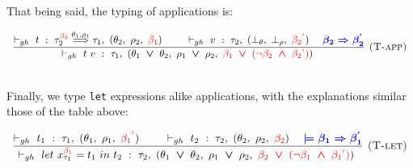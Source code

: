 \documentclass[a4paper,11pt,oneside]{article}
\theoremstyle{plain}
\newcommand{\rouge}[1]{\textcolor{red}{#1}}
\newcommand{\bwedge}{\boldsymbol{~\wedge~}}
\newcommand{\bvee}{\boldsymbol{~\vee~}}
\newcommand{\ghosttyping}[6]{\vdash_{gh}~#1~:~#2,~(#3,~#4,~\rouge{#5})~\textcolor{blue}{\boldsymbol{#6}}}
\newcommand{\bth}{\bot_\theta}
\newcommand{\brh}{\bot_\rho}
\newcommand{\gba}[1]{\beta_{#1}}
\newcommand{\gbb}{\bot_\beta}
\newcommand{\gbt}{\top_\beta}
\newcommand{\gbra}[1]{\textcolor{red}{\gba{#1}}}
\newcommand{\gbbr}{\textcolor{red}{\gbb}}
\newcommand{\gbtr}{\textcolor{red}{\gbt}}
\newcommand{\gbran}[1]{\textcolor{red}{\neg\gba{#1}}}
\begin{document}
That being said, the typing of applications is: 
\begin{footnotesize}	
\begin{displaymath}
\begin{array}{l}
\dfrac
	{
		\ghosttyping
			{t}
			{{\tau_{2}^{\gbra{2}} \stackrel{\theta_1, \rho_1}{\Longrightarrow} \tau_1}}
			{\theta_2}
			{\rho_2}
			{\gbra{1}}
			{} \qquad
		\ghosttyping
		{v}
		{\tau_2}
		{\bth}
		{\brh}
		{\gbra{2}^{\rouge{'}}}
		{\quad \gba{2} \Rightarrow \gba{2}^{'}}}
	{
		\ghosttyping
			{t~v}
			{\tau_1}
			{\theta_1 \bvee \theta_2}
			{\rho_1 \bvee \rho_2}
			{\gbra{1} \bvee (\gbran{2} \bwedge \gbra{2}^{\rouge{'}})}
			{}}
	{
		\textsc{  (T-app)}} 
\end{array}	
\end{displaymath}
\end{footnotesize}	
~\\
Finally, we type \texttt{let} expressions alike applications, with the explanations similar those of the table above:
%
\begin{footnotesize}	
\begin{displaymath}
\begin{array}{l}
\dfrac
	{
		\ghosttyping
			{t_1}
			{\tau_1}
			{\theta_1}
			{\rho_1}
			{\gbra{1}^{\rouge{'}}}
			{} \qquad
		\ghosttyping
			{t_2}
			{\tau_2}
			{\theta_2}
			{\rho_2}
			{\gbra{2}}
			{  \quad \models \gba{1} \Rightarrow \gba{1}^{'}}
	}
	{\ghosttyping
		{let~x^{\gbra{1}}_{\tau_1} = t_1~in~t_2}
		{\tau_2}
		{\theta_1 \bvee \theta_2}
		{\rho_1 \bvee \rho_2}
		{\gbra{2} \bvee (\gbran{1} \bwedge \gbra{1}^{\rouge{'}})}
		{}}
	{\textsc{  (T-let)}}
	\end{array}	
\end{displaymath}
\end{footnotesize}	
~\\
\end{document}
